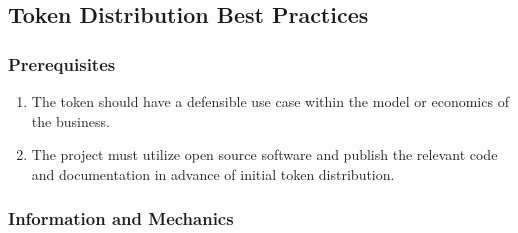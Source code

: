 \documentclass[12pt]{article}
\begin{document}
\subsection{Token Distribution Best Practices}

\subsubsection{Prerequisites}

\begin{enumerate}
    
    \item The token should have a defensible use case within the model or economics of the business.
    \item The project must utilize open source software and publish the relevant code and documentation in advance of initial token distribution.
\end{enumerate}

\subsubsection{Information and Mechanics}
\end{document}
